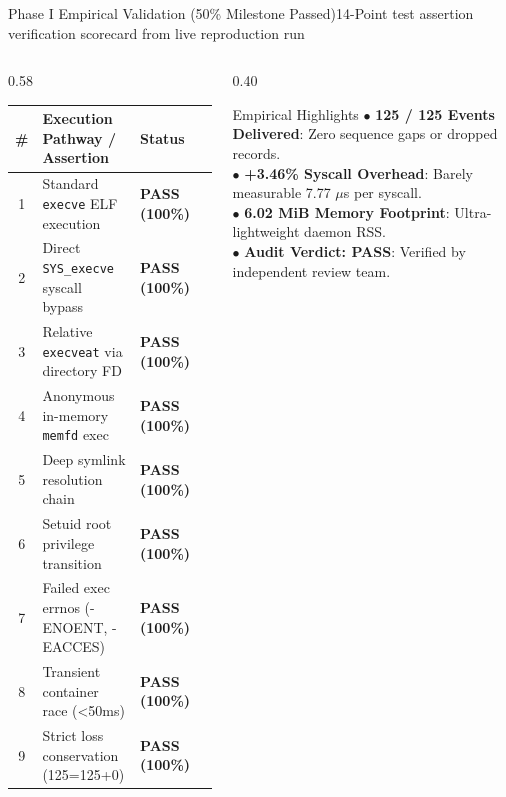 \documentclass[aspectratio=169,10pt]{beamer}
\begin{document}
\begin{frame}{Phase I Empirical Validation (50\% Milestone Passed)}{14-Point test assertion verification scorecard from live reproduction run}
  \begin{columns}[c]
    \begin{column}{0.58\textwidth}
      \scriptsize
      \begin{table}[htbp]
      \centering
      \begin{tabularx}{\textwidth}{c >{\raggedright\arraybackslash}p{4.2cm} X c}
        \toprule
        \textbf{\#} & \textbf{Execution Pathway / Assertion} & \textbf{Status} \\
        \midrule
        1 & Standard \texttt{execve} ELF execution & \textbf{\textcolor{emeraldDark}{PASS (100\%)}} \\
        2 & Direct \texttt{SYS\_execve} syscall bypass & \textbf{\textcolor{emeraldDark}{PASS (100\%)}} \\
        3 & Relative \texttt{execveat} via directory FD & \textbf{\textcolor{emeraldDark}{PASS (100\%)}} \\
        4 & Anonymous in-memory \texttt{memfd} exec & \textbf{\textcolor{emeraldDark}{PASS (100\%)}} \\
        5 & Deep symlink resolution chain & \textbf{\textcolor{emeraldDark}{PASS (100\%)}} \\
        6 & Setuid root privilege transition & \textbf{\textcolor{emeraldDark}{PASS (100\%)}} \\
        7 & Failed exec errnos (-ENOENT, -EACCES) & \textbf{\textcolor{emeraldDark}{PASS (100\%)}} \\
        8 & Transient container race (<50ms) & \textbf{\textcolor{emeraldDark}{PASS (100\%)}} \\
        9 & Strict loss conservation (125=125+0) & \textbf{\textcolor{emeraldDark}{PASS (100\%)}} \\
        \bottomrule
      \end{tabularx}
      \end{table}
    \end{column}

    \begin{column}{0.40\textwidth}
      \begin{exampleblock}{Empirical Highlights}
        \scriptsize
        $\bullet$ \textbf{125 / 125 Events Delivered}: Zero sequence gaps or dropped records.\\
        $\bullet$ \textbf{+3.46\% Syscall Overhead}: Barely measurable 7.77 $\mu$s per syscall.\\
        $\bullet$ \textbf{6.02 MiB Memory Footprint}: Ultra-lightweight daemon RSS.\\
        $\bullet$ \textbf{Audit Verdict: PASS}: Verified by independent review team.
      \end{exampleblock}
    \end{column}
  \end{columns}
\end{frame}
\end{document}
